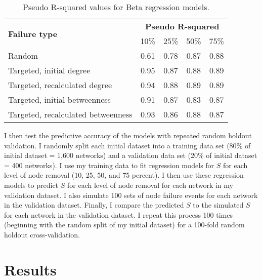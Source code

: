 \begin{table}
\centering

\begin{tabular}{lcccc}
\toprule
\multirow{2}{*}{\textbf{Failure type}} & \multicolumn{4}{c}{\textbf{Pseudo R-squared}}\\
 & {10\%} & {25\%} & {50\%} & {75\%}\\
\midrule
Random & 0.61 & 0.78 & 0.87 & 0.88 \\
Targeted, initial degree & 0.95 & 0.87 & 0.88 & 0.89 \\
Targeted, recalculated degree & 0.94 & 0.88 & 0.89 & 0.89 \\
Targeted, initial betweenness & 0.91 & 0.87 & 0.83 & 0.87 \\
Targeted, recalculated betweenness & 0.93 & 0.86 & 0.88 & 0.87 \\
\bottomrule

\end{tabular}

\caption{\label{tab:ch2:pseudorsquared}Pseudo R-squared values for Beta regression models.}
\end{table}


I then test the predictive accuracy of the models with repeated random holdout validation. I randomly split each initial dataset into a training data set (80\% of initial dataset = 1,600 networks) and a validation data set (20\% of initial dataset = 400 networks). I use my training data to fit regression models for $S$ for each level of node removal (10, 25, 50, and 75 percent). I then use these regression models to predict $S$ for each level of node removal for each network in my validation dataset. I also simulate 100 sets of node failure events for each network in the validation dataset.  Finally, I compare the predicted $S$ to the simulated $S$ for each network in the validation dataset. I repeat this process 100 times (beginning with the random split of my initial dataset) for a 100-fold random holdout cross-validation.


\section{Results}
\label{sec:ch2:results}

